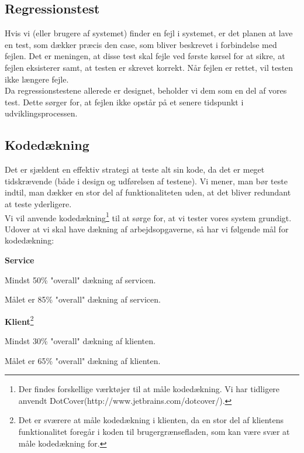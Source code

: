 \subsection{Regressionstest}
\label{Test_intendedStrat_regression}
Hvis vi (eller brugere af systemet) finder en fejl i systemet, er det planen at lave en test, som dækker præcis den case, som bliver beskrevet i forbindelse med fejlen. Det er meningen, at disse test skal fejle ved første kørsel for at sikre, at fejlen eksisterer samt, at testen er skrevet korrekt. Når fejlen er rettet, vil testen ikke længere fejle.
\\Da regressionstestene allerede er designet, beholder vi dem som en del af vores test. Dette sørger for, at fejlen ikke opstår på et senere tidspunkt i udviklingsprocessen.

\subsection{Kodedækning}
\label{Test_intendedStrat_coverage}
Det er sjældent en effektiv strategi at teste alt sin kode, da det er meget tidskrævende (både i design og udførelsen af testene). Vi mener, man bør teste indtil, man dækker en stor del af funktionaliteten uden, at det bliver redundant at teste yderligere. 
\\Vi vil anvende kodedækning\footnote{Der findes forskellige værktøjer til at måle kodedækning. Vi har tidligere anvendt DotCover(http://www.jetbrains.com/dotcover/).} til at sørge for, at vi tester vores system grundigt. Udover at vi skal have dækning af arbejdsopgaverne, så har vi følgende mål for kodedækning:
\begin{my_itemize}
\item \textbf{Service}
\item Mindst 50\% "overall" dækning af servicen.
\item Målet er 85\% "overall" dækning af servicen.
\item
\item \textbf{Klient}\footnote{Det er sværere at måle kodedækning i klienten, da en stor del af klientens funktionalitet foregår i koden til brugergrænsefladen, som kan være svær at måle kodedækning for.}
\item Mindst 30\% "overall" dækning af klienten.
\item Målet er 65\% "overall" dækning af klienten. 
\end{my_itemize}
